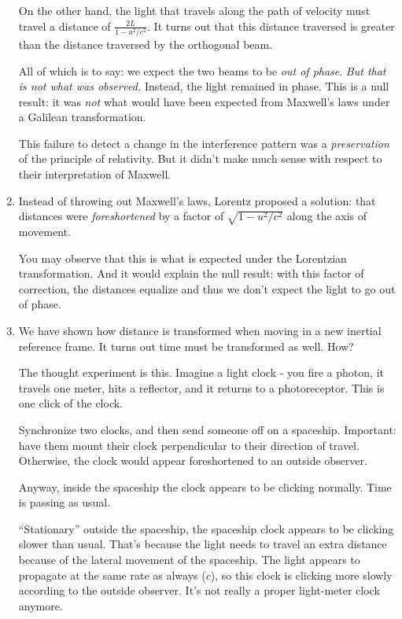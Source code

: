 \begin{enumerate}
  On the other hand, the light that travels along the path of velocity
  must travel a distance of $\frac{2L}{1 - u^2/c^2}$. It turns out that
  this distance traversed is greater than the distance traversed by the
  orthogonal beam.

  All of which is to say: we expect the two beams to be \emph{out of
  phase}. \emph{But that is not what was observed.} Instead, the light
  remained in phase. This is a null result: it was \emph{not} what would
  have been expected from Maxwell's laws under a Galilean
  transformation.

  This failure to detect a change in the interference pattern was a
  \emph{preservation} of the principle of relativity. But it didn't make
  much sense with respect to their interpretation of Maxwell.

  \item Instead of throwing out Maxwell's laws, Lorentz proposed a
  solution: that distances were \emph{foreshortened} by a factor of
  $\sqrt{1 - u^2/c^2}$ along the axis of movement.

  You may observe that this is what is expected under the Lorentzian
  transformation. And it would explain the null result: with this factor
  of correction, the distances equalize and thus we don't expect the
  light to go out of phase.

  \item We have shown how distance is transformed when moving in a new
  inertial reference frame. It turns out time must be transformed as
  well. How?

  The thought experiment is this. Imagine a light clock - you fire a
  photon, it travels one meter, hits a reflector, and it returns to a
  photoreceptor. This is one click of the clock.

  Synchronize two clocks, and then send someone off on a spaceship.
  Important: have them mount their clock perpendicular to their
  direction of travel. Otherwise, the clock would appear foreshortened
  to an outside observer.

  Anyway, inside the spaceship the clock appears to be clicking
  normally. Time is passing as usual.

  ``Stationary'' outside the spaceship, the spaceship clock appears to
  be clicking slower than usual. That's because the light needs to
  travel an extra distance because of the lateral movement of the
  spaceship. The light appears to propagate at the same rate as always
  ($c$), so this clock is clicking more slowly according to the outside
  observer. It's not really a proper light-meter clock anymore.


\end{enumerate}
